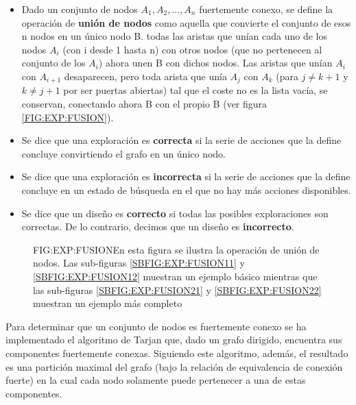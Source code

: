 \begin{itemize}
	\item Dado un conjunto de nodos ${A_1, A_2, ..., A_n}$ fuertemente conexo, se define la operación de \textbf{unión de nodos} como aquella que convierte el conjunto de esos n nodos en un único nodo B. todas las aristas que unían cada uno de los nodos $A_i$ (con i desde 1 hasta n) con otros nodos (que no pertenecen al conjunto de los $A_i$) ahora unen B con dichos nodos. Las aristas que unían $A_i$ con $A_{i+1}$ desaparecen, pero toda arista que unía $A_j$ con $A_k$ (para $j \not= k+1$ y $k \not= j+1$ por ser puertas abiertas) tal que el coste no es la lista vacía, se conservan, conectando ahora B con el propio B (ver figura \ref{FIG:EXP:FUSION}).
	
	\item Se dice que una exploración es \textbf{correcta} si la serie de acciones que la define concluye convirtiendo el grafo en un único nodo.
	
	\item Se dice que una exploración es \textbf{incorrecta} si la serie de acciones que la define concluye en un estado de búsqueda en el que no hay más acciones disponibles.
	
	\item Se dice que un diseño es \textbf{correcto} si todas las posibles exploraciones son correctas. De lo contrario, decimos que un diseño es \textbf{incorrecto}.
\end{itemize}

\begin{figure}{FIG:EXP:FUSION}{En esta figura se ilustra la operación de unión de nodos. Las sub-figuras \ref{SBFIG:EXP:FUSION11} y \ref{SBFIG:EXP:FUSION12} muestran un ejemplo básico mientras que las sub-figuras \ref{SBFIG:EXP:FUSION21} y \ref{SBFIG:EXP:FUSION22} muestran un ejemplo más completo}
	 \quad
	 \quad
	 \quad
	 \quad
\end{figure}

Para determinar que un conjunto de nodos es fuertemente conexo se ha implementado el algoritmo de Tarjan\cite{NUUTILA19949} que, dado un grafo dirigido, encuentra sus componentes fuertemente conexas. Siguiendo este algoritmo, además, el resultado es una partición maximal del grafo (bajo la relación de equivalencia de conexión fuerte) en la cual cada nodo solamente puede pertenecer a una de estas componentes.

